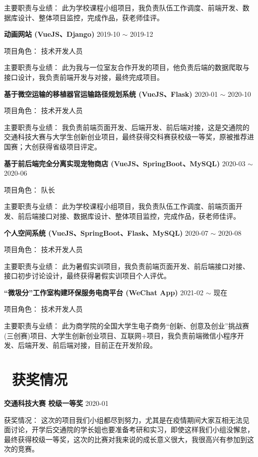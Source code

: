 \documentclass[12pt, a4paper]{article}
\begin{document}
主要职责与业绩： \quad 此为学校课程小组项目，我负责队伍工作调度、前端开发、数据库设计、整体项目监控，完成作品，获老师佳评。

\textbf{动画网站 (VueJS、Django)} \hfill 2019-10 $\sim$ 2019-12

项目角色： \quad 技术开发人员

主要职责与业绩： \quad 此为我与一位室友合作开发的项目，他负责后端的数据爬取与接口设计，我负责前端开发与对接，最终完成项目。

\textbf{基于微空运输的移植器官运输路径规划系统 (VueJS、Flask)} \hfill 2020-01 $\sim$ 2020-10

项目角色： \quad 技术开发人员

主要职责与业绩： \quad 我负责前端页面开发、后端开发、前后端对接，这是交通院的交通科技大赛与大学生创新创业项目，最终获得交科赛获校级一等奖，原被推荐进国赛；大创获得省级项目评定。

\textbf{基于前后端完全分离实现宠物商店 (VueJS、SpringBoot、MySQL)} \hfill 2020-03 $\sim$ 2020-06

项目角色： \quad 队长

主要职责与业绩： \quad 此为学校课程小组项目，我负责队伍工作调度、前端页面开发、前后端接口对接、数据库设计、整体项目监控，完成作品，获老师佳评。

\textbf{个人空间系统 (VueJS、SpringBoot、Flask、MySQL)} \hfill 2020-07 $\sim$ 2020-08

项目角色： \quad 技术开发人员

主要职责与业绩： \quad 此为暑假实训项目，我负责前端页面开发、前后端接口对接、接口初步讨论设计，最终获得暑假实训项目个人评优。

\textbf{``微圾分''工作室构建环保服务电商平台 (WeChat App)} \hfill 2021-02 $\sim$ 现在

项目角色： \quad 技术开发人员

主要职责与业绩： \quad 此为商学院的全国大学生电子商务“创新、创意及创业”挑战赛(三创赛)项目、大学生创新创业项目、互联网+项目，我负责前端微信小程序开发、后端开发、前后端对接，目前正在开发阶段。

\section{\color{CVBlue}\faHeart\ 获奖情况}

\textbf{交通科技大赛 \quad 校级一等奖} \hfill 2020-01

获奖情况： \quad 这次的项目我们小组都尽到努力，尤其是在疫情期间大家互相无法见面讨论，开学后交通院的学长姐也要准备考研和实习，即使这样我们小组没懈怠，最终获得校级一等奖，这次的比赛对我来说的成长意义很大，我很高兴有参加到这次的竞赛。
\end{document}
